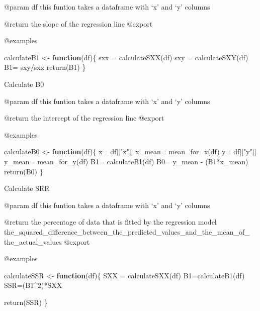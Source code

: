 \documentclass[
]{article}
\newenvironment{Shaded}{\begin{snugshade}}{\end{snugshade}}
\newcommand{\ControlFlowTok}[1]{\textcolor[rgb]{0.13,0.29,0.53}{\textbf{#1}}}
\newcommand{\DecValTok}[1]{\textcolor[rgb]{0.00,0.00,0.81}{#1}}
\newcommand{\FunctionTok}[1]{\textcolor[rgb]{0.00,0.00,0.00}{#1}}
\newcommand{\NormalTok}[1]{#1}
\newcommand{\OtherTok}[1]{\textcolor[rgb]{0.56,0.35,0.01}{#1}}
\newcommand{\SpecialCharTok}[1]{\textcolor[rgb]{0.00,0.00,0.00}{#1}}
\newcommand{\StringTok}[1]{\textcolor[rgb]{0.31,0.60,0.02}{#1}}
\begin{document}
@param df this funtion takes a dataframe with `x' and `y' columns

@return the slope of the regression line @export

@examples

\begin{Shaded}
\begin{Highlighting}[]
\NormalTok{calculateB1 }\OtherTok{\textless{}{-}} \ControlFlowTok{function}\NormalTok{(df)\{}
\NormalTok{  sxx }\OtherTok{=} \FunctionTok{calculateSXX}\NormalTok{(df)}
\NormalTok{  sxy }\OtherTok{=} \FunctionTok{calculateSXY}\NormalTok{(df)}
\NormalTok{  B1}\OtherTok{=}\NormalTok{ sxy}\SpecialCharTok{/}\NormalTok{sxx}
  \FunctionTok{return}\NormalTok{(B1)}
\NormalTok{\}}
\end{Highlighting}
\end{Shaded}

Calculate B0

@param df this funtion takes a dataframe with `x' and `y' columns

@return the intercept of the regression line @export

@examples

\begin{Shaded}
\begin{Highlighting}[]
\NormalTok{calculateB0 }\OtherTok{\textless{}{-}} \ControlFlowTok{function}\NormalTok{(df)\{}
\NormalTok{  x}\OtherTok{=}\NormalTok{ df[[}\StringTok{"x"}\NormalTok{]]}
\NormalTok{  x\_mean}\OtherTok{=} \FunctionTok{mean\_for\_x}\NormalTok{(df)}
\NormalTok{  y}\OtherTok{=}\NormalTok{ df[[}\StringTok{"y"}\NormalTok{]]}
\NormalTok{  y\_mean}\OtherTok{=} \FunctionTok{mean\_for\_y}\NormalTok{(df)}
\NormalTok{  B1}\OtherTok{=} \FunctionTok{calculateB1}\NormalTok{(df)}
\NormalTok{  B0}\OtherTok{=}\NormalTok{ y\_mean }\SpecialCharTok{{-}}\NormalTok{ (B1}\SpecialCharTok{*}\NormalTok{x\_mean)}
  \FunctionTok{return}\NormalTok{(B0)}
\NormalTok{\}}
\end{Highlighting}
\end{Shaded}

Calculate SRR

@param df this funtion takes a dataframe with `x' and `y' columns

@return the percentage of data that is fitted by the regression model
the\_squared\_difference\_between\_the\_predicted\_values\_and\_the\_mean\_of\_
the\_actual\_values @export

@examples

\begin{Shaded}
\begin{Highlighting}[]
\NormalTok{calculateSSR }\OtherTok{\textless{}{-}} \ControlFlowTok{function}\NormalTok{(df)\{}
\NormalTok{  SXX }\OtherTok{=} \FunctionTok{calculateSXX}\NormalTok{(df)}
\NormalTok{  B1}\OtherTok{=}\FunctionTok{calculateB1}\NormalTok{(df)}
\NormalTok{  SSR}\OtherTok{=}\NormalTok{(B1}\SpecialCharTok{\^{}}\DecValTok{2}\NormalTok{)}\SpecialCharTok{*}\NormalTok{SXX}
  
  \FunctionTok{return}\NormalTok{(SSR)}
\NormalTok{\}}
\end{Highlighting}
\end{Shaded}
\end{document}
